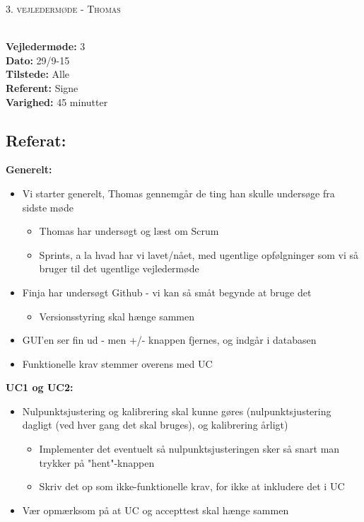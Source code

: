 \documentclass[a4paper,11pt,oneside]{memoir}
\begin{document}
\newpage


\begin{center} 
\huge{\textsc{3. vejledermøde - Thomas}}
\end{center}

\textbf{ }
\\
\textbf{Vejledermøde:} 3 
\\
\textbf{Dato:} 29/9-15
\\
\textbf{Tilstede:} Alle
\\
\textbf{Referent:} Signe
\\
\textbf{Varighed:} 45 minutter
\\

\subsection{Referat:}
\textbf{Generelt:}
\begin{itemize}
\item Vi starter generelt, Thomas gennemgår de ting han skulle undersøge fra sidste møde
\begin{itemize}
\item Thomas har undersøgt og læst om Scrum
\item Sprints, a la hvad har vi lavet/nået, med ugentlige opfølgninger som vi så bruger til det ugentlige vejledermøde
\end{itemize}
\item Finja har undersøgt Github - vi kan så småt begynde at bruge det
\begin{itemize}
\item Versionsstyring skal hænge sammen
\end{itemize}
\item GUI'en ser fin ud - men +/- knappen fjernes, og indgår i databasen
\item Funktionelle krav stemmer overens med UC
\end{itemize}

\textbf{UC1 og UC2:}
\begin{itemize}
\item Nulpunktsjustering og kalibrering skal kunne gøres (nulpunktsjustering dagligt (ved hver gang det skal bruges), og kalibrering årligt)
\begin{itemize}
\item Implementer det eventuelt så nulpunktsjusteringen sker så snart man trykker på "hent"-knappen
\item Skriv det op som ikke-funktionelle krav, for ikke at inkludere det i UC 
\end{itemize}
\item Vær opmærksom på at UC og accepttest skal hænge sammen
\end{itemize}
\end{document}
